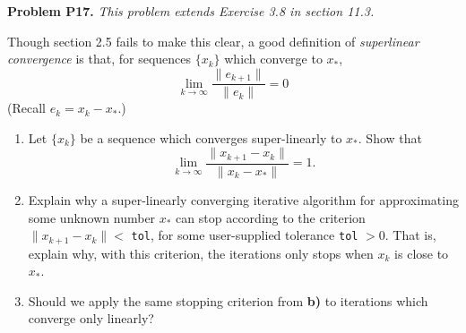 \documentclass[12pt]{amsart}
\newcommand{\prob}[1]{\bigskip\noindent\textbf{#1}\quad }
\begin{document}
\prob{Problem P17.}  \emph{This problem extends Exercise 3.8 in section 11.3.}

\medskip \noindent Though section 2.5 fails to make this clear, a good definition of \emph{superlinear convergence} is that, for sequences $\{x_k\}$ which converge to $x_*$,
    $$\lim_{k\to\infty} \frac{\|e_{k+1}\|}{\|e_k\|} = 0$$
(Recall $e_k = x_k - x_*$.)

\begin{enumerate}
\item Let $\{x_k\}$ be a sequence which converges super-linearly to $x_*$.  Show that
    $$\lim_{k\to\infty} \frac{\|x_{k+1} - x_k\|}{\|x_k - x_*\|} = 1.$$
\item Explain why a super-linearly converging iterative algorithm for approximating some unknown number $x_*$ can stop according to the criterion $\|x_{k+1} - x_k\| < $ \texttt{tol}, for some user-supplied tolerance \texttt{tol} $ > 0$.  That is, explain why, with this criterion, the iterations only stops when $x_k$ is close to $x_*$.
\item Should we apply the same stopping criterion from \textbf{b)} to iterations which converge only linearly? 
\end{enumerate}
\end{document}
